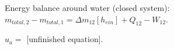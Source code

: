 Energy balance around water (closed system):  
\( m_{total,2} - m_{total,1} = \Delta m_{12} [h_{ein}] + Q_{12} - W_{12} \).  

\( u_a = \) [unfinished equation].